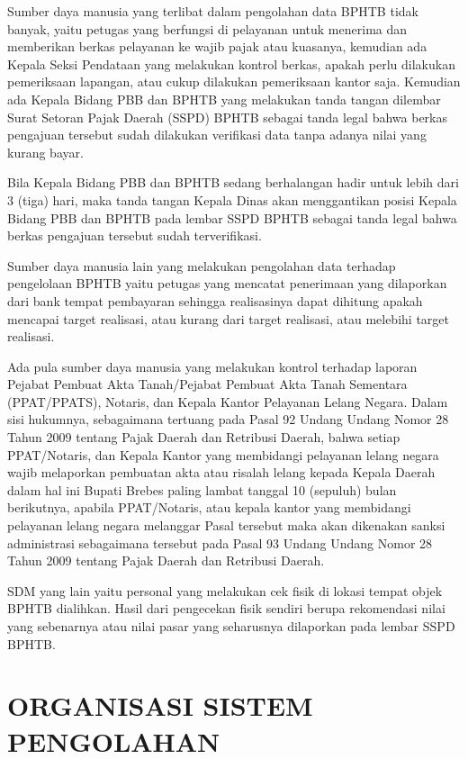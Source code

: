 \documentclass[pdftex,12pt, oneside]{article}
\begin{document}
Sumber daya manusia yang terlibat dalam pengolahan data BPHTB tidak banyak, yaitu petugas yang berfungsi di pelayanan untuk menerima dan memberikan berkas pelayanan ke wajib pajak atau kuasanya, kemudian ada Kepala Seksi Pendataan yang melakukan kontrol berkas, apakah perlu dilakukan pemeriksaan lapangan, atau cukup dilakukan pemeriksaan kantor saja. Kemudian ada Kepala Bidang PBB dan BPHTB yang melakukan tanda tangan dilembar Surat Setoran Pajak Daerah (SSPD) BPHTB sebagai tanda legal bahwa berkas pengajuan tersebut sudah dilakukan verifikasi data tanpa adanya nilai yang kurang bayar.

Bila Kepala Bidang PBB dan BPHTB sedang berhalangan hadir untuk lebih dari 3 (tiga) hari, maka tanda tangan Kepala Dinas akan menggantikan posisi Kepala Bidang PBB dan BPHTB pada lembar SSPD BPHTB sebagai tanda legal bahwa berkas pengajuan tersebut sudah terverifikasi.

Sumber daya manusia lain yang melakukan pengolahan data terhadap pengelolaan BPHTB yaitu petugas yang mencatat penerimaan yang dilaporkan dari bank tempat pembayaran sehingga realisasinya dapat dihitung apakah mencapai target realisasi, atau kurang dari target realisasi, atau melebihi target realisasi.

Ada pula sumber daya manusia yang melakukan kontrol terhadap laporan Pejabat Pembuat Akta Tanah/Pejabat Pembuat Akta Tanah Sementara (PPAT/PPATS), Notaris, dan Kepala Kantor Pelayanan Lelang Negara. Dalam sisi hukumnya, sebagaimana tertuang pada Pasal 92 Undang Undang Nomor 28 Tahun 2009 tentang Pajak Daerah dan Retribusi Daerah, bahwa setiap PPAT/Notaris, dan Kepala Kantor yang membidangi pelayanan lelang negara wajib melaporkan pembuatan akta atau risalah lelang kepada Kepala Daerah dalam hal ini Bupati Brebes paling lambat tanggal 10 (sepuluh) bulan berikutnya, apabila PPAT/Notaris, atau kepala kantor yang membidangi pelayanan lelang negara melanggar Pasal tersebut maka akan dikenakan sanksi administrasi sebagaimana tersebut pada Pasal 93 Undang Undang Nomor 28 Tahun 2009 tentang Pajak Daerah dan Retribusi Daerah.

SDM yang lain yaitu personal yang melakukan cek fisik di lokasi tempat objek BPHTB dialihkan. Hasil dari pengecekan fisik sendiri berupa rekomendasi nilai yang sebenarnya atau nilai pasar yang seharusnya dilaporkan pada lembar SSPD BPHTB.

\section{ORGANISASI SISTEM PENGOLAHAN}
\end{document}

